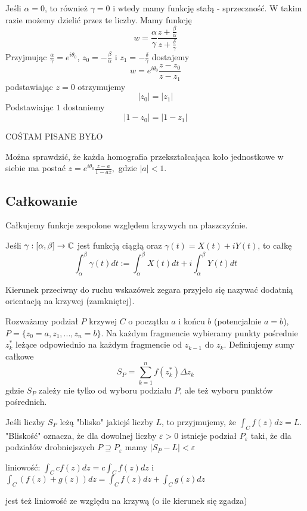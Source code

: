 Jeśli $\alpha=0$, to również $\gamma=0$ i wtedy mamy funkcję stałą - sprzeczność. W takim razie możemy dzielić przez te liczby. Mamy funkcję
$$w=\frac{\alpha}{\gamma}\frac{z+\frac{\beta}{\alpha}}{z+\frac{\delta}{\gamma}}$$
Przyjmując $\frac{\alpha}{\gamma}=e^{i\theta_0}$, $z_0=-\frac{\beta}{\alpha}$ i $z_1=-\frac{\delta}{\gamma}$ dostajemy
$$w=e^{i\theta_0}\frac{z-z_0}{z-z_1}$$
podstawiając $z=0$ otrzymujemy
$$|z_0|=|z_1|$$
Podstawiając $1$ dostaniemy 
$$|1-z_0|=|1-z_1|$$

{\large\color{red}COŚTAM PISANE BYŁO}

Można sprawdzić, że każda homografia przekształcająca koło jednostkowe w siebie ma postać $z=e^{i\theta_0}\frac{z-a}{1-a\overline{z}},$ gdzie $|a|<1$.

\subsection{Całkowanie}

Całkujemy funkcje zespolone względem krzywych na płaszczyźnie.

Jeśli $\gamma:[\alpha, \beta]\to\operatorname{\mathbb{C}}$ jest funkcją ciągłą oraz $\gamma(t)=X(t)+iY(t)$, to całkę 
$$\int_\alpha^\beta \gamma(t)dt:=\int_\alpha^\beta X(t)dt+i\int_\alpha^\beta Y(t)dt$$

Kierunek przeciwny do ruchu wskazówek zegara przyjeło się nazywać dodatnią orientacją na krzywej (zamkniętej).

Rozważamy podział $P$ krzywej $C$ o początku $a$ i końcu $b$ (potencjalnie $a=b$), $P=\{z_0=a, z_1,..., z_n=b\}$. Na każdym fragmencie wybieramy punkty pośrednie $z_k^*$ leżące odpowiednio na każdym fragmencie od $z_{k-1}$ do $z_k$. Definiujemy sumy całkowe
$$S_P=\sum_{k=1}^nf(z_k^*)\Delta z_k$$
gdzie $S_P$ zależy nie tylko od wyboru podziału $P$, ale też wyboru punktów pośrednich.

Jeśli liczby $S_P$ leżą "blisko" jakiejś liczby $L$, to przyjmujemy, że $\int_C f(z)dz=L$. "Bliskość" oznacza, że dla dowolnej liczby $\varepsilon>0$ istnieje podział $P_\varepsilon$ taki, że dla podziałów drobniejszych $P\supseteq P_\varepsilon$ mamy $|S_P-L|<\varepsilon$

\begin{fact}
  liniowość: $\int_Ccf(z)dz=c\int_Cf(z)dz$ i $\int_C(f(z)+g(z))dz=\int_Cf(z)dz+\int_Cg(z)dz$

  jest też liniowość ze względu na krzywą (o ile kierunek się zgadza)
\end{fact}
